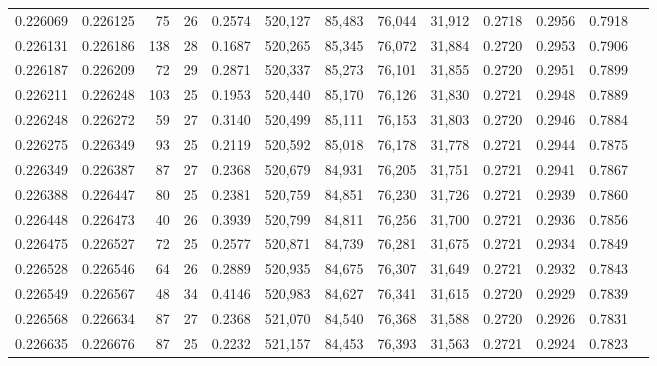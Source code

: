 \begin{tabular}{rrrrrrrrrrrrr}
0.226069 & 0.226125 &  75 &  26 &                                     0.2574 & 520,127 &  85,483 &  76,044 &  31,912 & 0.2718 & 0.2956 & 0.7918 \\
0.226131 & 0.226186 & 138 &  28 &                                     0.1687 & 520,265 &  85,345 &  76,072 &  31,884 & 0.2720 & 0.2953 & 0.7906 \\
0.226187 & 0.226209 &  72 &  29 &                                     0.2871 & 520,337 &  85,273 &  76,101 &  31,855 & 0.2720 & 0.2951 & 0.7899 \\
0.226211 & 0.226248 & 103 &  25 &                                     0.1953 & 520,440 &  85,170 &  76,126 &  31,830 & 0.2721 & 0.2948 & 0.7889 \\
0.226248 & 0.226272 &  59 &  27 &                                     0.3140 & 520,499 &  85,111 &  76,153 &  31,803 & 0.2720 & 0.2946 & 0.7884 \\
0.226275 & 0.226349 &  93 &  25 &                                     0.2119 & 520,592 &  85,018 &  76,178 &  31,778 & 0.2721 & 0.2944 & 0.7875 \\
0.226349 & 0.226387 &  87 &  27 &                                     0.2368 & 520,679 &  84,931 &  76,205 &  31,751 & 0.2721 & 0.2941 & 0.7867 \\
0.226388 & 0.226447 &  80 &  25 &                                     0.2381 & 520,759 &  84,851 &  76,230 &  31,726 & 0.2721 & 0.2939 & 0.7860 \\
0.226448 & 0.226473 &  40 &  26 &                                     0.3939 & 520,799 &  84,811 &  76,256 &  31,700 & 0.2721 & 0.2936 & 0.7856 \\
0.226475 & 0.226527 &  72 &  25 &                                     0.2577 & 520,871 &  84,739 &  76,281 &  31,675 & 0.2721 & 0.2934 & 0.7849 \\
0.226528 & 0.226546 &  64 &  26 &                                     0.2889 & 520,935 &  84,675 &  76,307 &  31,649 & 0.2721 & 0.2932 & 0.7843 \\
0.226549 & 0.226567 &  48 &  34 &                                     0.4146 & 520,983 &  84,627 &  76,341 &  31,615 & 0.2720 & 0.2929 & 0.7839 \\
0.226568 & 0.226634 &  87 &  27 &                                     0.2368 & 521,070 &  84,540 &  76,368 &  31,588 & 0.2720 & 0.2926 & 0.7831 \\
0.226635 & 0.226676 &  87 &  25 &                                     0.2232 & 521,157 &  84,453 &  76,393 &  31,563 & 0.2721 & 0.2924 & 0.7823 \\

\end{tabular}
